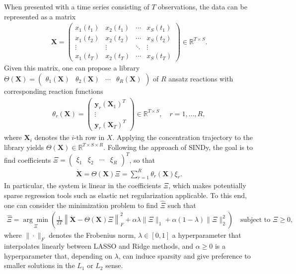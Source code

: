\documentclass[oneside, abstracton, titlepage]{scrartcl}
\begin{document}
	When presented with a time series consisting of $T$ observations, the data can be represented as a matrix
	\begin{align}
	\textbf{X} = \begin{pmatrix}
		x_1(t_1) & x_2(t_1) & \cdots & x_S(t_1) \\
		x_1(t_2) & x_2(t_2) & \cdots & x_S(t_2) \\
		\vdots   & \vdots   & \ddots & \vdots   \\
		x_1(t_T) & x_2(t_T) & \cdots & x_S(t_T)
	\end{pmatrix} \in \mathbb{R}^{T\times S}.
	\end{align}
	Given this matrix, one can propose a library $\Theta(\textbf{X}) = \begin{pmatrix} \theta_1(\textbf{X}) & \theta_2(\textbf{X}) & \cdots & \theta_R(\textbf{X}) \end{pmatrix}$ of $R$ ansatz reactions with corresponding reaction functions
	\begin{align}
		\theta_r(\textbf{X}) = \begin{pmatrix}
		\textbf{y}_r(\textbf{X}_1)^T \\ \vdots \\ \textbf{y}_r(\textbf{X}_T)^T
		\end{pmatrix}\in \mathbb{R}^{T\times S},\quad r=1,\ldots,R,
	\label{method:the-reactions}\end{align}
	where $\textbf{X}_i$ denotes the $i$-th row in $X$. Applying the concentration trajectory to the library yields $\Theta(\textbf{X})\in\mathbb{R}^{T\times S\times R}$. Following the approach of SINDy, the goal is to find coefficients $\Xi = \begin{pmatrix} \xi_1 & \xi_2 & \cdots & \xi_R
	\end{pmatrix}^T$, so that
	\begin{align}
	\dot{\textbf{X}} = \Theta(\textbf{X})\Xi = \sum_{r=1}^{R}\theta_r(\textbf{X})\xi_r.
	\end{align}
	In particular, the system is linear in the coefficients $\Xi$, which makes potentially sparse regression tools such as elastic net regularization \cite{Zou2005} applicable. To this end, one can consider the minimization problem to find $\hat{\Xi}$ such that
	\begin{align}
		\hat{\Xi} = \underset{\Xi}{\arg\min}\left( \frac{1}{2T}\left\| \dot{\textbf{X}} - \Theta(\textbf{X})\Xi \right\|_F^2 + \alpha\lambda\|\Xi\|_1 + \alpha(1-\lambda)\|\Xi\|_2^2 \right) \quad \text{subject to }\Xi \geq 0,
	\label{method:minimizationproblem}\end{align}
	where $\|\cdot\|_F$ denotes the Frobenius norm, $\lambda\in[0,1]$ a hyperparameter that interpolates linearly between LASSO \cite{Tibshirani1996, Hastie2009} and Ridge \cite{Hoerl1} methods, and $\alpha\geq 0$ is a hyperparameter that, depending on $\lambda$, can induce sparsity and give preference to smaller solutions in the $L_1$ or $L_2$ sense. 
	
\end{document}
